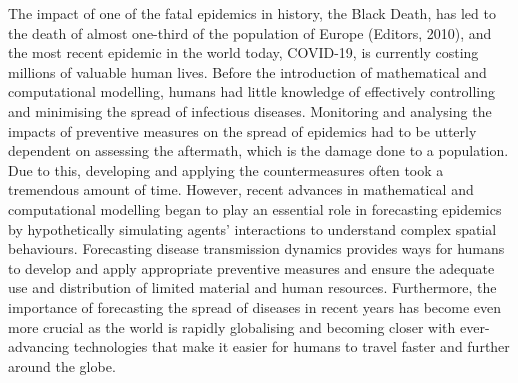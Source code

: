\documentclass{article}
\begin{document}
The impact of one of the fatal epidemics in history, the Black Death, has led to the death of almost one-third of the population of Europe (Editors, 2010), and the most recent epidemic in the world today, COVID-19, is currently costing millions of valuable human lives. Before the introduction of mathematical and computational modelling, humans had little knowledge of effectively controlling and minimising the spread of infectious diseases. Monitoring and analysing the impacts of preventive measures on the spread of epidemics had to be utterly dependent on assessing the aftermath, which is the damage done to a population. Due to this, developing and applying the countermeasures often took a tremendous amount of time. However, recent advances in mathematical and computational modelling began to play an essential role in forecasting epidemics by hypothetically simulating agents’ interactions to understand complex spatial behaviours. Forecasting disease transmission dynamics provides ways for humans to develop and apply appropriate preventive measures and ensure the adequate use and distribution of limited material and human resources. Furthermore, the importance of forecasting the spread of diseases in recent years has become even more crucial as the world is rapidly globalising and becoming closer with ever-advancing technologies that make it easier for humans to travel faster and further around the globe.
\end{document}
